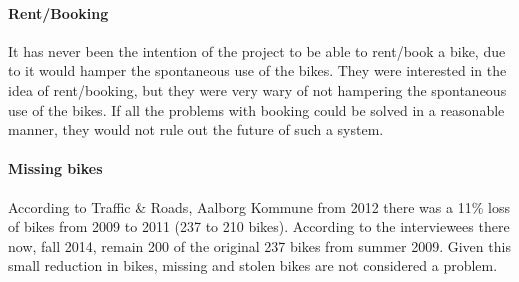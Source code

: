 \paragraph{Rent/Booking}
It has never been the intention of the project to be able to rent/book a bike, due to it would hamper the spontaneous use of the bikes.
They were interested in the idea of rent/booking, but they were very wary of not hampering the spontaneous use of the bikes.
If all the problems with booking could be solved in a reasonable manner, they would not rule out the future of such a system.


\paragraph{Missing bikes}
According to Traffic \& Roads, Aalborg Kommune\cite{cykelplanlaegning} from 2012 there was a 11\% loss of bikes from 2009 to 2011 (237 to 210 bikes).
According to the interviewees there now, fall 2014, remain 200 of the original 237 bikes from summer 2009. 
Given this small reduction in bikes, missing and stolen bikes are not considered a problem.